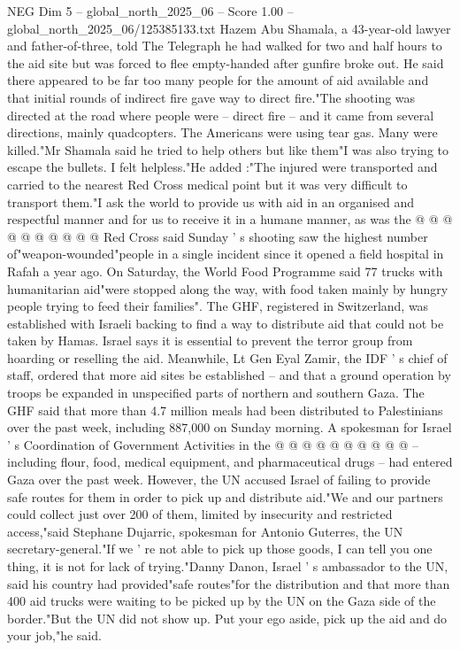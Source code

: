 \begin{textsample}{NEG Dim 5 – global\_north\_2025\_06 – Score 1.00 – global\_north\_2025\_06/125385133.txt}  \label{ex:f5_neg_387}
Hazem Abu Shamala, a 43-year-old lawyer and father-of-three, told The Telegraph he had walked for two and half hours to the aid site but was forced to flee empty-handed after gunfire broke out.
He said there appeared to be far too many people for the amount of aid available and that initial rounds of indirect fire gave way to direct fire."The shooting was directed at the road where people were -- direct fire -- and it came from several directions, mainly quadcopters.
The Americans were using tear gas.
Many were killed."Mr Shamala said he tried to help others but like them"I was also trying to escape the bullets.
I felt helpless."He added :"The injured were transported and carried to the nearest Red Cross medical point but it was very difficult to transport them."I ask the world to provide us with aid in an organised and respectful manner and for us to receive it in a humane manner, as was the @ @ @ @ @ @ @ @ @ @ Red Cross said Sunday ' s shooting saw the highest number of"weapon-wounded"people in a single incident since it opened a field hospital in Rafah a year ago.
On Saturday, the World Food Programme said 77 trucks with humanitarian aid"were stopped along the way, with food taken mainly by hungry people trying to feed their families".
The GHF, registered in Switzerland, was established with Israeli backing to find a way to distribute aid that could not be taken by Hamas.
Israel says it is essential to prevent the terror group from hoarding or reselling the aid.
Meanwhile, Lt Gen Eyal Zamir, the IDF ' s chief of staff, ordered that more aid sites be established -- and that a ground operation by troops be expanded in unspecified parts of northern and southern Gaza.
The GHF said that more than 4.7 million meals had been distributed to Palestinians over the past week, including 887,000 on Sunday morning.
A spokesman for Israel ' s Coordination of Government Activities in the @ @ @ @ @ @ @ @ @ @ -- including flour, food, medical equipment, and pharmaceutical drugs -- had entered Gaza over the past week.
However, the UN accused Israel of failing to provide safe routes for them in order to pick up and distribute aid."We and our partners could collect just over 200 of them, limited by insecurity and restricted access,"said Stephane Dujarric, spokesman for Antonio Guterres, the UN secretary-general."If we ' re not able to pick up those goods, I can tell you one thing, it is not for lack of trying."Danny Danon, Israel ' s ambassador to the UN, said his country had provided"safe routes"for the distribution and that more than 400 aid trucks were waiting to be picked up by the UN on the Gaza side of the border."But the UN did not show up.
Put your ego aside, pick up the aid and do your job,"he said.

\end{textsample}
